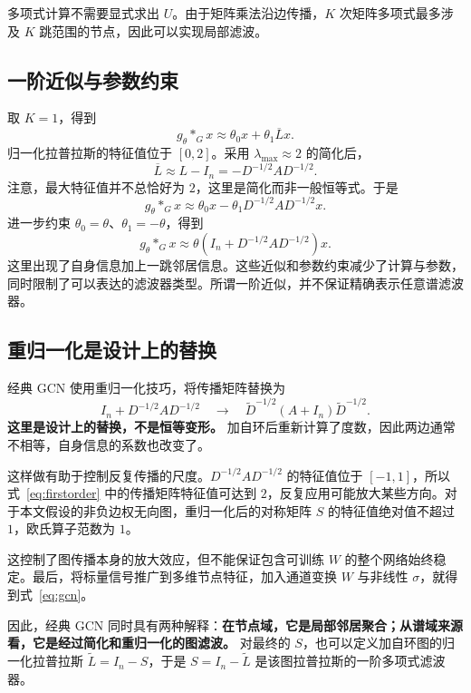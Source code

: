 \documentclass[UTF8,a4paper,11pt,fontset=fandol]{ctexart}
\begin{document}
多项式计算不需要显式求出 $U$。由于矩阵乘法沿边传播，$K$ 次矩阵多项式最多涉及 $K$ 跳范围的节点，因此可以实现局部滤波。

\subsection{一阶近似与参数约束}
取 $K=1$，得到
\begin{equation}
g_\theta *_G x\approx\theta_0x+\theta_1\overline Lx.
\end{equation}
归一化拉普拉斯的特征值位于 $[0,2]$。采用 $\lambda_{\max}\approx2$ 的简化后，
\begin{equation}
\overline L\approx L-I_n=-D^{-1/2}AD^{-1/2}.
\end{equation}
注意，最大特征值并不总恰好为 $2$，这里是简化而非一般恒等式。于是
\begin{equation}
g_\theta *_G x\approx
\theta_0x-\theta_1D^{-1/2}AD^{-1/2}x.
\end{equation}
进一步约束 $\theta_0=\theta$、$\theta_1=-\theta$，得到
\begin{equation}
g_\theta *_G x\approx
\theta\left(I_n+D^{-1/2}AD^{-1/2}\right)x.
\label{eq:firstorder}
\end{equation}
这里出现了自身信息加上一跳邻居信息。这些近似和参数约束减少了计算与参数，同时限制了可以表达的滤波器类型。所谓一阶近似，并不保证精确表示任意谱滤波器。

\subsection{重归一化是设计上的替换}
经典 GCN 使用重归一化技巧，将传播矩阵替换为
\begin{equation}
I_n+D^{-1/2}AD^{-1/2}
\quad\longrightarrow\quad
\widetilde D^{-1/2}(A+I_n)\widetilde D^{-1/2}.
\end{equation}
\textbf{这里是设计上的替换，不是恒等变形。} 加自环后重新计算了度数，因此两边通常不相等，自身信息的系数也改变了。

这样做有助于控制反复传播的尺度。$D^{-1/2}AD^{-1/2}$ 的特征值位于 $[-1,1]$，所以式~\eqref{eq:firstorder} 中的传播矩阵特征值可达到 $2$，反复应用可能放大某些方向。对于本文假设的非负边权无向图，重归一化后的对称矩阵 $S$ 的特征值绝对值不超过 $1$，欧氏算子范数为 $1$。

这控制了图传播本身的放大效应，但不能保证包含可训练 $W$ 的整个网络始终稳定。最后，将标量信号推广到多维节点特征，加入通道变换 $W$ 与非线性 $\sigma$，就得到式~\eqref{eq:gcn}。

因此，经典 GCN 同时具有两种解释：\textbf{在节点域，它是局部邻居聚合；从谱域来源看，它是经过简化和重归一化的图滤波。} 对最终的 $S$，也可以定义加自环图的归一化拉普拉斯 $\widetilde L=I_n-S$，于是 $S=I_n-\widetilde L$ 是该图拉普拉斯的一阶多项式滤波器。
\end{document}
